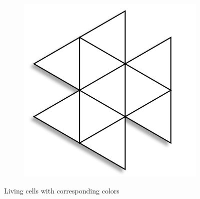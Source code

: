 \documentclass{article}
\begin{document}
\begin{figure}[H]
\begin{subfigure}[b]{0.1\textwidth}
    \end{subfigure}
    \begin{subfigure}[b]{0.1\textwidth}
        \centering
        \includegraphics[width=.9\textwidth]{graphics/behavior/center-columns/white.png}
    \end{subfigure}
       \caption{Living cells with corresponding colors}
       \label{fig:colors}
\end{figure}
\end{document}

